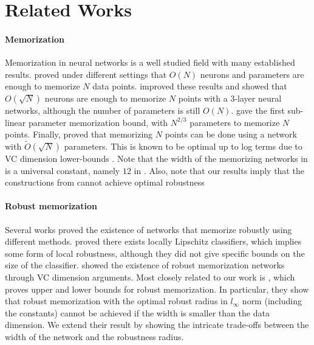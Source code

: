 \section{Related Works}
\label{sec:related}

\paragraph{Memorization}

Memorization in neural networks is a well studied field with many established results. \cite{baum1988capabilities,bubeck2020network,huang1991bounds,huang1998upper,sartori1991simple,zhang2021understanding} proved under different settings that $O(N)$ neurons and parameters are enough to memorize $N$ data points. \cite{huang2003learning,yun2019small} improved these results and showed that $O(\sqrt{N})$ neurons are enough to memorize $N$ points with a $3$-layer neural networks, although the number of parameters is still $O(N)$.  \cite{park2021provable} gave the first sub-linear parameter memorization bound, with $N^{2/3}$ parameters to memorize $N$ points. Finally, \cite{vardi2021optimal} proved that memorizing $N$ points can be done using a network with $\tilde{O}(\sqrt{N})$ parameters. This is known to be optimal up to log terms due to VC dimension lower-bounds \citep{goldberg1995bounding,bartlett2019nearly}. Note that the width of the memorizing networks in \cite{park2021provable,vardi2021optimal} is a universal constant, namely $12$ in \cite{vardi2021optimal}. Also, note that our results imply that the constructions from \cite{park2021provable,vardi2021optimal} cannot achieve optimal robustness

\paragraph{Robust memorization}

Several works proved the existence of networks that memorize robustly using different methods. \cite{yang2020closer,bastounis2021mathematics} proved there exists locally Lipschitz classifiers, which implies some form of local robustness, although they did not give specific bounds on the size of the classifier. \cite{li2022robust} showed the existence of robust memorization networks through VC dimension arguments. Most closely related to our work is \cite{yuoptimal}, which proves upper and lower bounds for robust memorization. In particular, they show that robust memorization with the optimal robust radius in $l_\infty$ norm (including the constants) cannot be achieved  if the width is smaller than the data dimension. We extend their result by showing the intricate trade-offs between the width of the network and the robustness radius. 

